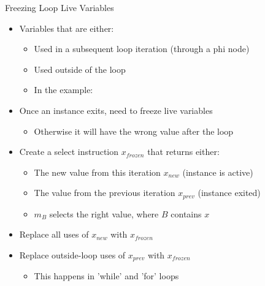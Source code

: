 \begin{frame}{Freezing Loop Live Variables}

\begin{itemize}
    \item Variables that are either:
    \begin{itemize}
        \item Used in a subsequent loop iteration (through a phi node)
        \item Used outside of the loop
        \item In the example: 
    \end{itemize}
    \item Once an instance exits, need to freeze live variables
    \begin{itemize}
        \item Otherwise it will have the wrong value after the loop 
    \end{itemize}
    \item Create a select instruction $x_{frozen}$ that returns either: 
    \begin{itemize}
        \item The new value from this iteration $x_{new}$ (instance is active)
        \item The value from the previous iteration $x_{prev}$ (instance exited)
        \item $m_{B}$ selects the right value, where $B$ contains $x$
    \end{itemize}
    \item Replace all uses of $x_{new}$ with $x_{frozen}$
    \item Replace outside-loop uses of $x_{prev}$ with $x_{frozen}$
    \begin{itemize}
        \item This happens in 'while' and 'for' loops
    \end{itemize}
\end{itemize}

\end{frame}


